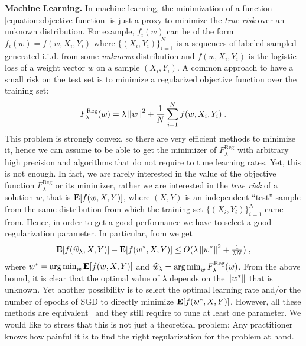 \textbf{Machine Learning.} In machine learning, the minimization of a function
\eqref{equation:objective-function} is just a proxy to minimize the \emph{true
risk} over an unknown distribution. For example, $f_i(w)$ can be of the form
$f_i(w) = f(w, X_i, Y_i)$ where $\{(X_i, Y_i)\}_{i=1}^N$ is a sequences of
labeled sampled generated i.i.d. from some \emph{unknown} distribution and
$f(w, X_i, Y_i)$ is the logistic loss of a weight vector $w$ on a sample $(X_i,
Y_i)$.  A common approach to have a small risk on the test set is to minimize a
regularized objective function over the training set:
%
\begin{equation}
\label{equation:reg_logloss}
F_\lambda^{\text{Reg}}(w) = \lambda \left\|{w}\right\|^2 + \frac{1}{N} \sum_{i=1}^N f(w, X_i, Y_i) \; .
\end{equation}
%
This problem is strongly convex, so there are very efficient methods to
minimize it, hence we can assume to be able to get the minimizer of
$F_\lambda^{\text{Reg}}$ with arbitrary high precision and algorithms that do
not require to tune learning rates. Yet, this is not enough. In fact, we are
rarely interested in the value of the objective function
$F_\lambda^{\text{Reg}}$ or its minimizer, rather we are interested in the
\emph{true risk} of a solution $w$, that is $\operatorname*{\mathbf{E}}[f(w,X,Y)]$, where $(X,Y)$ is
an independent ``test'' sample from the same distribution from which the
training set $\{(X_i,Y_i)\}_{i=1}^N$ came from. Hence, in order to get a good
performance we have to select a good regularization parameter. In particular,
from \cite{Sridharan-Shalev-Shwartz-Srebro-2009} we get
\[
\operatorname*{\mathbf{E}}[f(\widehat{w}_\lambda,X,Y)] - \operatorname*{\mathbf{E}}[f(w^*,X,Y)] \le O(\lambda \left\|{w^*}\right\|^2 + \tfrac{1}{\lambda N}) \; ,
\]
where $w^*=\operatorname*{arg\,min}_w \operatorname*{\mathbf{E}}[f(w,X,Y)]$ and $\widehat{w}_\lambda = \operatorname*{arg\,min}_w
F_\lambda^{\text{Reg}}(w)$.  From the above bound, it is clear that the optimal
value of $\lambda$ depends on the $\left\|{w^*}\right\|$ that is unknown.  Yet another
possibility is to select the optimal learning rate and/or the number of epochs
of \ac{SGD} to directly minimize $\operatorname*{\mathbf{E}}[f(w^*,X,Y)]$. However, all these methods
are equivalent~\citep{Lin-Camoriano-Rosasco-2016} and they still require to
tune at least one parameter.
We would like to stress that this is not just a theoretical problem: Any
practitioner knows how painful it is to find the right regularization for the
problem at hand.


